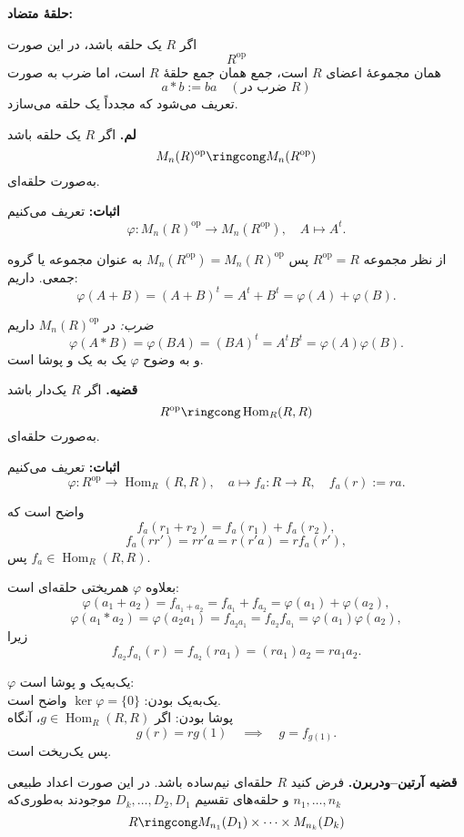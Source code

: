 \textbf{حلقهٔ متضاد:}

اگر $R$ یک حلقه باشد، در این صورت
\[
    R^{\mathrm{op}}
\]
همان مجموعهٔ اعضای $R$ است، جمع همان جمع حلقهٔ $R$ است،
اما ضرب به صورت
\[
    a \ast b := ba \quad (\text{ضرب در $R$})
\]
تعریف می‌شود که مجدداً یک حلقه می‌سازد.

\textbf{لم.} اگر $R$ یک حلقه باشد
\[
    M_n(R)^{\mathrm{op}} \ringcong M_n(R^{\mathrm{op}})
\]
به‌صورت حلقه‌ای.

\textbf{اثبات:} تعریف می‌کنیم
\[
    \varphi : M_n(R)^{\mathrm{op}} \longrightarrow M_n(R^{\mathrm{op}}),
    \quad
    A \longmapsto A^t.
\]


از نظر مجموعه
\(R^{\mathrm{op}} = R\)
پس
$M_n(R^{\mathrm{op}}) = M_n(R)^{\mathrm{op}}$
به عنوان مجموعه یا گروه جمعی. داریم:
\[
    \varphi(A+B) = (A+B)^t = A^t + B^t = \varphi(A) + \varphi(B).
\]

\textit{  ضرب:}
در $M_n(R)^{\mathrm{op}}$ داریم
\[
    \varphi(A \ast B) = \varphi(BA) = (BA)^t = A^t B^t = \varphi(A) \varphi(B).
\]
و به وضوح $\varphi$ یک به یک و پوشا است.


\textbf{قضیه.} اگر $R$ یک‌دار باشد
\[
    R^{\mathrm{op}} \ringcong \operatorname{Hom}_R(R,R)
\]
به‌صورت حلقه‌ای.

\textbf{اثبات:}
تعریف می‌کنیم
\[
    \varphi : R^{\mathrm{op}} \longrightarrow \operatorname{Hom}_R(R,R),
    \quad
    a \longmapsto f_a : R \to R,\quad f_a(r) := ra.
\]

واضح است که
\[
    f_a(r_1 + r_2) = f_a(r_1) + f_a(r_2),
\]
\[
    f_a(rr') = r r' a = r (r'a) = r f_a(r'),
\]
پس $f_a \in \operatorname{Hom}_R(R,R)$.

بعلاوه $\varphi$ همریختی حلقه‌ای است:
\[
    \varphi(a_1 + a_2) = f_{a_1 + a_2} = f_{a_1} + f_{a_2} = \varphi(a_1) + \varphi(a_2),
\]
\[
    \varphi(a_1 \ast a_2) = \varphi(a_2 a_1) = f_{a_2 a_1} = f_{a_2} f_{a_1} = \varphi(a_1) \varphi(a_2),
\]
زیرا
\[
    f_{a_2} f_{a_1}(r) = f_{a_2}(r a_1) = (r a_1) a_2 = r a_1 a_2.
\]

$\varphi$ یک‌به‌یک و پوشا است:\\
یک‌به‌یک بودن: $\ker\varphi = \{0\}$ واضح است.\\
پوشا بودن: اگر $g \in \operatorname{Hom}_R(R,R)$، آنگاه
\[
    g(r) = r g(1) \quad \implies \quad g = f_{g(1)}.
\]
پس یک‌ریخت است.

\textbf{قضیه آرتین–ودربرن.}
فرض کنید $R$ حلقه‌ای نیم‌ساده باشد. در این صورت اعداد طبیعی
\(n_1, \dots, n_k\)
و حلقه‌های تقسیم $D_k, \dots, D_2, D_1$ موجودند به‌طوری‌که
\[
    R \ringcong M_{n_1}(D_1) \times \cdots \times M_{n_k}(D_k)
\]

